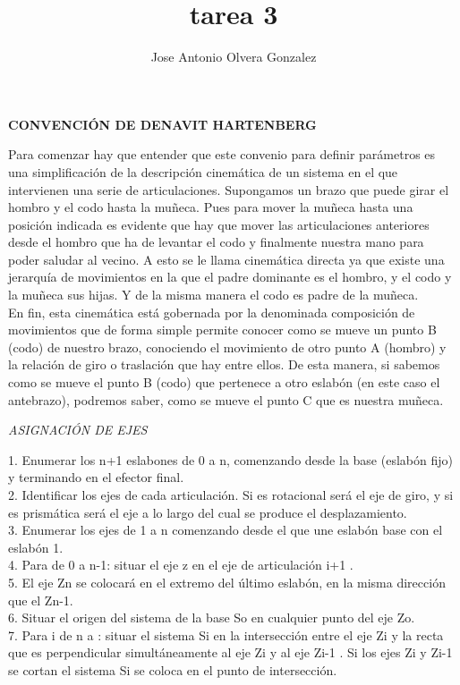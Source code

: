 \documentclass[12pt,letterpaper]{report}
\author{Jose Antonio Olvera Gonzalez }
\title{tarea 3}
\begin{document}
\textbf{CONVENCIÓN DE DENAVIT HARTENBERG}
\begin{flushleft}
Para comenzar hay que entender que este convenio para definir parámetros es una simplificación de la descripción cinemática de un sistema en el que intervienen una serie de articulaciones.
Supongamos un brazo que puede girar el hombro y el codo hasta la muñeca. Pues para mover la muñeca hasta una posición indicada es evidente que hay que mover las articulaciones anteriores desde el hombro que ha de levantar el codo y finalmente nuestra mano para poder saludar al vecino. A esto se le llama cinemática directa ya que existe una jerarquía de movimientos en la que el padre dominante es el hombro, y el codo y la muñeca sus hijas. Y de la misma manera el codo es padre de la muñeca.\\
En fin, esta cinemática está gobernada por la denominada composición de movimientos que de forma simple permite conocer como se mueve un punto B (codo) de nuestro brazo, conociendo el movimiento de otro punto A (hombro) y la relación de giro o traslación que hay entre ellos. De esta manera, si sabemos como se mueve el punto B (codo) que pertenece a otro eslabón (en este caso el antebrazo), podremos saber, como se mueve el punto C que es nuestra muñeca.
\begin{flushleft}
\emph{ASIGNACIÓN DE EJES}
\begin{flushleft}
1. Enumerar los n+1 eslabones de 0 a n, comenzando desde la base (eslabón fijo) y
terminando en el efector final.\\

2. Identificar los ejes de cada articulación. Si es rotacional será el eje de giro, y si es
prismática será el eje a lo largo del cual se produce el desplazamiento.\\

3. Enumerar los ejes de 1 a n comenzando desde el que une eslabón base con el eslabón 1.\\

4. Para de 0 a  n-1: situar el eje z en el eje de articulación i+1 .\\

5. El eje Zn se colocará en el extremo del último eslabón, en la misma dirección que el Zn-1.\\

6. Situar el origen del sistema de la base {So} en cualquier punto del eje Zo.\\

7. Para i de n  a : situar el sistema {Si} en la intersección entre el eje Zi y la recta que
es perpendicular simultáneamente al eje Zi y al eje Zi-1 . Si los ejes Zi y  Zi-1 se
cortan el sistema {Si} se coloca en el punto de intersección.\\


\end{flushleft}
\end{flushleft}
\end{flushleft}
\end{document}
